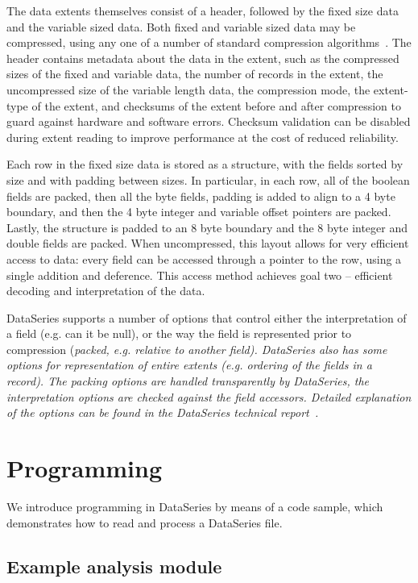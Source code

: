 \documentclass{acm_proc_article-sp}
\begin{document}
The data extents themselves consist of a header, followed by the fixed
size data and the variable sized data.  Both fixed and variable sized
data may be compressed, using any one of a number of standard
compression algorithms~\cite{GZIP,BZIP,LZF,LZO}.  The header contains
metadata about the data in the extent, such as the compressed sizes of
the fixed and variable data, the number of records in the extent, the
uncompressed size of the variable length data, the compression mode,
the extent-type of the extent, and checksums of the extent before and
after compression to guard against hardware and software errors.
Checksum validation can be disabled during extent reading to improve
performance at the cost of reduced reliability.

Each row in the fixed size data is stored as a structure, with the
fields sorted by size and with padding between sizes.  In particular,
in each row, all of the boolean fields are packed, then all the byte
fields, padding is added to align to a 4 byte boundary, and then the 4
byte integer and variable offset pointers are packed.  Lastly, the
structure is padded to an 8 byte boundary and the 8 byte integer and
double fields are packed. When uncompressed, this layout allows for
very efficient access to data: every field can be accessed through a
pointer to the row, using a single addition and deference.  This
access method achieves goal two -- efficient decoding and
interpretation of the data.

DataSeries supports a number of options that control either the
interpretation of a field (e.g. can it be null), or the way the field
is represented prior to compression (\em{packed}, e.g. relative to
another field).  DataSeries also has some options for representation
of entire extents (e.g. ordering of the fields in a record).  The
packing options are handled transparently by DataSeries, the
interpretation options are checked against the field accessors.
Detailed explanation of the options can be found in the DataSeries
technical report~\cite{DSTechnicalReportSnapshot}.

\section{Programming}\label{sec:programming}

We introduce programming in DataSeries by means of a code sample,
which demonstrates how to read and process a DataSeries file.  

\subsection{Example analysis module}
\end{document}
